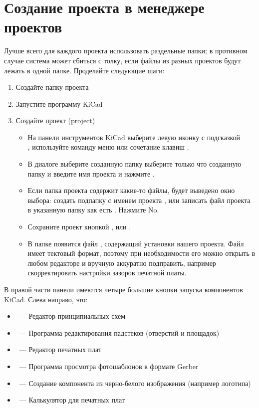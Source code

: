 \section{Создание проекта в менеджере проектов }

Лучше всего для каждого проекта использовать раздельные папки; в противном
случае система может сбиться с толку, если файлы из разных проектов будут лежать
в одной папке. Проделайте следующие шаги:

\begin{enumerate}
  \item Создайте папку проекта 
  \item Запустите программу KiCad
  \item Создайте проект (project)
  \begin{itemize}
    \item 
На панели инструментов KiCad выберите левую иконку с подсказкой\\
, используйте команду меню
 или сочетание клавиш .
    \item 
В диалоге  выберите созданную папку
выберите только что созданную папку  и
введите имя проекта  и нажмите .
	\item
Если папка проекта содержит какие-то файлы, будет выведено окно выбора:
создать подпапку с именем проекта , или записать файл проекта
в указанную папку как есть . Нажмите No.
    \item 
Сохраните проект кнопкой , 
или .
	\item
В папке появится файл , содержащий установки вашего 
проекта. Файл имеет тектовый формат, поэтому при необходимости его можно открыть
в любом редакторе и вручную аккуратно подправить, например скорректировать
настройки зазоров печатной платы.
  \end{itemize}
\end{enumerate}

В правой части панели имеются четыре большие кнопки запуска компонентов KiCad.
Слева направо, это:

\begin{itemize}
\item {}\ --- Редактор принципиальных схем
\item {}\ --- Программа редактирования падстеков (отверстий и
площадок)
\item {}\ --- Редактор печатных плат
\item {}\ --- Программа просмотра фотошаблонов в формате Gerber
\item {}\ --- Создание компонента из черно-белого
изображения (например логотипа)
\item {}\ --- Калькулятор для печатных плат
\end{itemize}

